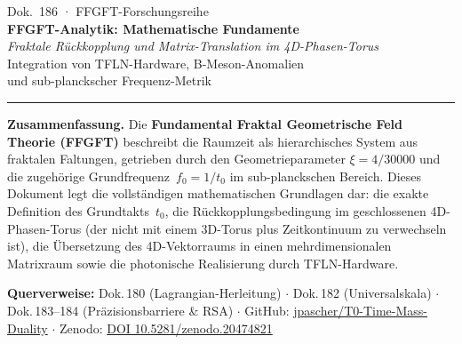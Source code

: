 
\thispagestyle{firstpage}
\begin{center}
  {\small\color{T0gray} Dok.~186 · FFGFT-Forschungsreihe}\\[6pt]
  {\LARGE\bfseries\color{T0blue}
    FFGFT-Analytik: Mathematische Fundamente}\\[6pt]
  {\large\itshape\color{T0gray}
    Fraktale Rückkopplung und Matrix-Translation im 4D-Phasen-Torus}\\[4pt]
  {\normalsize\color{T0gray}
    Integration von TFLN-Hardware, B-Meson-Anomalien\\
    und sub-planckscher Frequenz-Metrik}\\[8pt]
  {\color{T0red}\rule{0.65\linewidth}{1.5pt}}
\end{center}
\vspace{4pt}

\begin{infobox}
\textbf{Zusammenfassung.}
Die \textbf{Fundamental Fraktal Geometrische Feld Theorie (FFGFT)} beschreibt
die Raumzeit als hierarchisches System aus fraktalen Faltungen, getrieben
durch den Geometrieparameter $\xi = 4/30000$ und die zugehörige
Grundfrequenz~$f_0 = 1/t_0$ im sub-planckschen Bereich.
Dieses Dokument legt die vollständigen mathematischen Grundlagen dar:
die exakte Definition des Grundtakts~$t_0$, die Rückkopplungsbedingung im
geschlossenen 4D-Phasen-Torus (der nicht mit einem 3D-Torus plus Zeitkontinuum
zu verwechseln ist), die Übersetzung des 4D-Vektorraums in einen mehrdimensionalen
Matrixraum sowie die photonische Realisierung durch TFLN-Hardware.

\smallskip\noindent\textbf{Querverweise:}
Dok.\,180 (Lagrangian-Herleitung) $\cdot$
Dok.\,182 (Universalskala) $\cdot$
Dok.\,183--184 (Präzisionsbarriere \& RSA) $\cdot$
GitHub: \href{https://github.com/jpascher/T0-Time-Mass-Duality}{jpascher/T0-Time-Mass-Duality} $\cdot$
Zenodo: \href{https://zenodo.org/records/20474821}{DOI 10.5281/zenodo.20474821}
\end{infobox}

\tableofcontents
\bigskip

